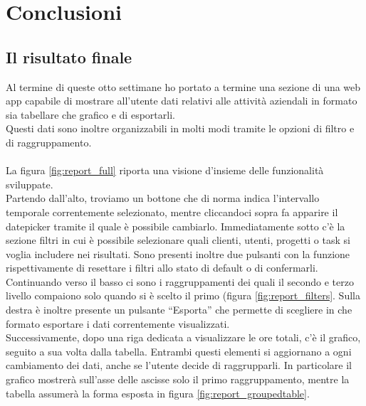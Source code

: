 
\chapter{Conclusioni}
\label{cap:conclusioni}

\section{Il risultato finale}
Al termine di queste otto settimane ho portato a termine una sezione di una web app capabile di mostrare all'utente dati relativi alle attività aziendali in formato sia tabellare che grafico e di esportarli.\\
Questi dati sono inoltre organizzabili in molti modi tramite le opzioni di filtro e di raggruppamento.\\\\
La figura \ref{fig:report_full} riporta una visione d'insieme delle funzionalità sviluppate.\\
Partendo dall'alto, troviamo un bottone che di norma indica l'intervallo temporale correntemente selezionato, mentre cliccandoci sopra fa apparire il datepicker tramite il quale è possibile cambiarlo. Immediatamente sotto c'è la sezione filtri in cui è possibile selezionare quali clienti, utenti, progetti o task si voglia includere nei risultati. Sono presenti inoltre due pulsanti con la funzione rispettivamente di resettare i filtri allo stato di default o di confermarli.\\
Continuando verso il basso ci sono i raggruppamenti dei quali il secondo e terzo livello compaiono solo quando si è scelto il primo (figura \ref{fig:report_filters}. Sulla destra è inoltre presente un pulsante ``Esporta'' che permette di scegliere in che formato esportare i dati correntemente visualizzati.\\
Successivamente, dopo una riga dedicata a visualizzare le ore totali, c'è il grafico, seguito a sua volta dalla tabella. Entrambi questi elementi si aggiornano a ogni cambiamento dei dati, anche se l'utente decide di raggrupparli. In particolare il grafico mostrerà sull'asse delle ascisse solo il primo raggruppamento, mentre la tabella assumerà la forma esposta in figura \ref{fig:report_groupedtable}.\\
